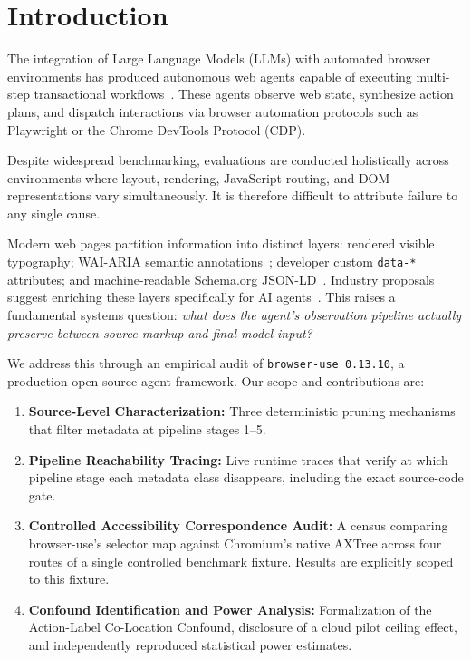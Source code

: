 \documentclass[conference]{IEEEtran}
\begin{document}
\section{Introduction}
\label{sec:intro}

The integration of Large Language Models (LLMs) with automated browser environments has produced autonomous web agents capable of executing multi-step transactional workflows~\cite{zhou2024webarena, deng2023mind2web, drouin2024workarena, workarenapp2024, osworld2024}. These agents observe web state, synthesize action plans, and dispatch interactions via browser automation protocols such as Playwright or the Chrome DevTools Protocol (CDP).

Despite widespread benchmarking, evaluations are conducted holistically across environments where layout, rendering, JavaScript routing, and DOM representations vary simultaneously. It is therefore difficult to attribute failure to any single cause.

Modern web pages partition information into distinct layers: rendered visible typography; WAI-ARIA semantic annotations~\cite{wai_aria12, accname11}; developer custom \texttt{data-*} attributes; and machine-readable Schema.org JSON-LD~\cite{schemaorg}. Industry proposals suggest enriching these layers specifically for AI agents~\cite{llmstxt2024, mcp2024}. This raises a fundamental systems question: \textit{what does the agent's observation pipeline actually preserve between source markup and final model input?}

We address this through an empirical audit of \texttt{browser-use 0.13.10}, a production open-source agent framework. Our scope and contributions are:
\begin{enumerate}
    \item \textbf{Source-Level Characterization:} Three deterministic pruning mechanisms that filter metadata at pipeline stages 1--5.
    \item \textbf{Pipeline Reachability Tracing:} Live runtime traces that verify at which pipeline stage each metadata class disappears, including the exact source-code gate.
    \item \textbf{Controlled Accessibility Correspondence Audit:} A census comparing browser-use's selector map against Chromium's native AXTree across four routes of a single controlled benchmark fixture. Results are explicitly scoped to this fixture.
    \item \textbf{Confound Identification and Power Analysis:} Formalization of the Action-Label Co-Location Confound, disclosure of a cloud pilot ceiling effect, and independently reproduced statistical power estimates.
\end{enumerate}
\end{document}
